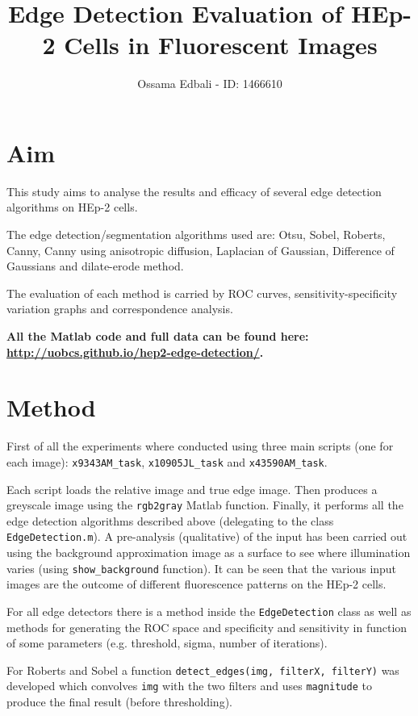 \documentclass{article}
\title{Edge Detection Evaluation of HEp-2 Cells in Fluorescent Images}
\author{Ossama Edbali - ID: 1466610}
\begin{document}
	
	\maketitle	
	
	\section{Aim}
	
	This study aims to analyse the results and efficacy of several edge detection algorithms
	on HEp-2 cells.
	
	The edge detection/segmentation algorithms used are: Otsu, Sobel, Roberts, Canny,
	Canny using anisotropic diffusion,
	Laplacian of Gaussian, Difference of Gaussians and dilate-erode method.
	
	The evaluation of each method is carried by ROC curves, sensitivity-specificity variation graphs and correspondence analysis.
	
	\textbf{All the Matlab code and full data can be found here: \url{http://uobcs.github.io/hep2-edge-detection/}.}
	
	\section{Method}

	First of all the experiments where conducted using three main scripts (one for each
	image):
	\verb|x9343AM_task|, \verb|x10905JL_task| and \verb|x43590AM_task|.
	
	Each script loads the relative image and true edge image. Then produces a greyscale image using the \texttt{rgb2gray} Matlab function.
	Finally, it performs all the edge detection algorithms described above (delegating
		to the class \texttt{EdgeDetection.m}).
	A pre-analysis (qualitative) of the input has been carried out using the
	background approximation image as a surface to see where illumination varies (using \verb|show_background| function).
	It can be seen that the various input images are the outcome of different fluorescence patterns on	the HEp-2 cells.
	
	For all edge detectors there is a method inside the \texttt{EdgeDetection} class
	as well as methods for generating the ROC space and specificity and sensitivity
	in function of some parameters (e.g. threshold, sigma, number of iterations).
	
	For Roberts and Sobel a function \verb|detect_edges(img, filterX, filterY)| was developed which convolves \verb|img| with the two filters and uses
	\verb|magnitude| to produce the final result (before thresholding).
	
\end{document}
